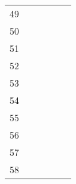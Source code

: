 \begin{table}[ht]
\begin{tabular}{c|lllll}
    49                       &                                          &                                           &                                                &                                    &                                      \\
    50                       &                                          &                                           &                                                &                                    &                                      \\
    51                       &                                          &                                           &                                                &                                    &                                      \\
    52                       &                                          &                                           &                                                &                                    &                                      \\
    53                       &                                          &                                           &                                                &                                    &                                      \\
    54                       &                                          &                                           &                                                &                                    &                                      \\
    55                       &                                          &                                           &                                                &                                    &                                      \\
    56                       &                                          &                                           &                                                &                                    &                                      \\
    57                       &                                          &                                           &                                                &                                    &                                      \\
    58                       &                                          &                                           &                                                &                                    &                                      \\

\end{tabular}
\end{table}
